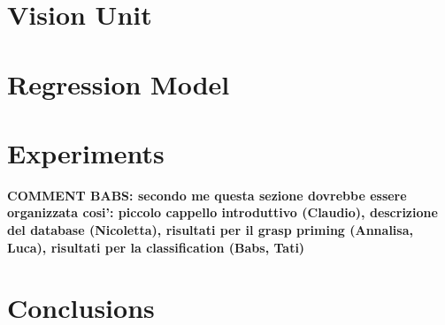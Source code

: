\documentclass{article}
\begin{document}


\section{Vision Unit}
\label{sec::vision}


\section{Regression Model}
\label{sec::regression}


\section{Experiments}
{\bf COMMENT BABS: secondo me questa sezione dovrebbe essere organizzata cosi': piccolo cappello introduttivo (Claudio),
descrizione del database (Nicoletta), risultati per il grasp priming (Annalisa, Luca), risultati per la classification 
(Babs, Tati)}



\section{Conclusions}



\end{document}
